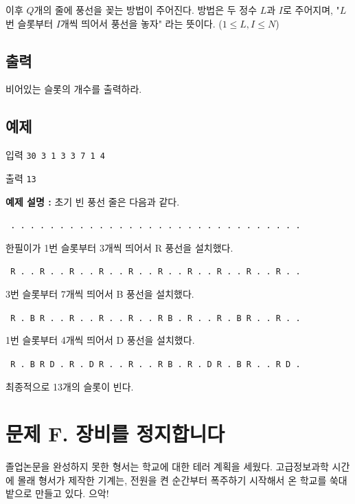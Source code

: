\documentclass{article}
\begin{document}
이후 $Q$개의 줄에 풍선을 꽂는 방법이 주어진다. 방법은 두 정수 $L$과 $I$로 주어지며, "$L$번 슬롯부터 $I$개씩 띄어서 풍선을 놓자" 라는 뜻이다. ($1 \leq L, I \leq N$)

\subsection{출력}
비어있는 슬롯의 개수를 출력하라.

\subsection{예제}
입력
\bgroup\obeylines
\texttt{30 3
	1 3
	3 7
	1 4		\newline}
\egroup

출력
\bgroup\obeylines
\texttt{13	\newline}
\egroup

\textbf{예제 설명 : } 초기 빈 풍선 줄은 다음과 같다. 

\texttt{
	. . . . . . . . . . . . . . . . . . . . . . . . . . . . . . \newline
}

한필이가 1번 슬롯부터 3개씩 띄어서 R 풍선을 설치했다.

\texttt{
	R . . R . . R . . R . . R . . R . . R . . R . . R . . R . . \newline
}

3번 슬롯부터 7개씩 띄어서 B 풍선을 설치했다.

\texttt{
	R . B R . . R . . R . . R . . R B . R . . R . B R . . R . . \newline
}

1번 슬롯부터 4개씩 띄어서 D 풍선을 설치했다. 

\texttt{
	R . B R D . R . D R . . R . . R B . R . D R . B R . . R D . \newline
}

최종적으로 13개의 슬롯이 빈다.
\newpage




\section{문제 F.  장비를 정지합니다}
졸업논문을 완성하지 못한 형서는 학교에 대한 테러 계획을 세웠다. 고급정보과학 시간에 몰래 형서가 제작한 기계는, 전원을 켠 순간부터 폭주하기 시작해서 온 학교를 쑥대밭으로 만들고 있다. 으악! \newline
\end{document}
